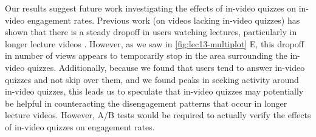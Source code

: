 \documentclass{sigchi}
\begin{document}



Our results suggest future work investigating the effects of in-video quizzes on in-video engagement rates. Previous work (on videos lacking in-video quizzes) has shown that there is a steady dropoff in users watching lectures, particularly in longer lecture videos \cite{juho}. However, as we saw in \autoref{fig:lec13-multiplot} E, this dropoff in number of views appears to temporarily stop in the area surrounding the in-video quizzes. Additionally, because we found that users tend to answer in-video quizzes and not skip over them, and we found peaks in seeking activity around in-video quizzes, this leads us to speculate that in-video quizzes may potentially be helpful in counteracting the disengagement patterns that occur in longer lecture videos. However, A/B tests would be required to actually verify the effects of in-video quizzes on engagement rates.
\end{document}
